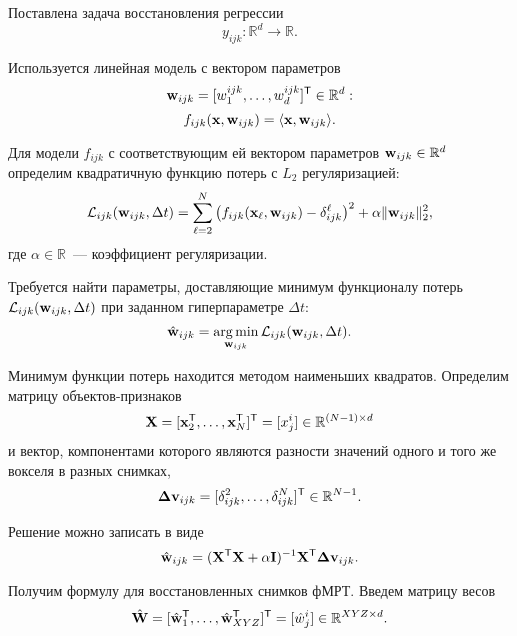 \documentclass[a4paper, 12pt]{article}
\begin{document}
	Поставлена задача восстановления регрессии
	\begin{equation}
		\label{eq6}
		y_{ijk}: \mathbb{R}^{d} \to \mathbb{R}.
	\end{equation}
		
	Используется линейная модель с вектором параметров 
	\[ \mathbf{w}_{ijk} = [w^{ijk}_1, \ldots, w^{ijk}_{d}]^{\mathsf{T}} \in \mathbb{R}^{d}: \]
	\begin{equation}
		\label{eq7}
		f_{ijk}(\mathbf{x}, \mathbf{w}_{ijk}) = \langle \mathbf{x}, \mathbf{w}_{ijk} \rangle.
	\end{equation}

	Для модели $f_{ijk}$ с соответствующим ей вектором параметров $\mathbf{w}_{ijk} \in \mathbb{R}^{d}$
	определим квадратичную функцию потерь с $L_2$ регуляризацией:
	\begin{equation}
		\label{eq8}
		\mathcal{L}_{ijk}(\mathbf{w}_{ijk}, \Delta t) = \sum\limits_{\ell = 2}^{N} \big(f_{ijk}(\mathbf{x}_{\ell}, \mathbf{w}_{ijk}) - \delta^{\ell}_{ijk}\big)^2 + \alpha \| \mathbf{w}_{ijk} \|_2^2,
	\end{equation}
	где $\alpha \in \mathbb{R}$~--- коэффициент регуляризации.

	Требуется найти параметры, доставляющие минимум функционалу потерь $\mathcal{L}_{ijk}(\mathbf{w}_{ijk}, \Delta t)$
	при заданном гиперпараметре $\Delta t$:
	\begin{equation}
		\label{eq9}
		\hat{\mathbf{w}}_{ijk} = \operatorname*{arg\,min}_{\mathbf{w}_{ijk}} \mathcal{L}_{ijk}(\mathbf{w}_{ijk}, \Delta t).
	\end{equation}

	Минимум функции потерь находится методом наименьших квадратов. Определим матрицу объектов-признаков
	\begin{equation}
		\label{eq10}
		\mathbf{X} = [\mathbf{x}_2^{\mathsf{T}}, \ldots, \mathbf{x}_N^{\mathsf{T}}]^{\mathsf{T}} = [x^i_j] \in \mathbb{R}^{(N-1) \times d}
	\end{equation}
	и вектор, компонентами которого являются разности значений одного и того же вокселя в разных снимках,
	\begin{equation}
		\label{eq11}
		\mathbf{\Delta v}_{ijk} = [\delta^2_{ijk}, \ldots, \delta^N_{ijk}]^{\mathsf{T}} \in \mathbb{R}^{N-1}.
	\end{equation}

	Решение можно записать в виде
	\begin{equation}
		\label{eq12}
		\hat{\mathbf{w}}_{ijk} = (\mathbf{X}^{\mathsf{T}} \mathbf{X} + \alpha \mathbf{I})^{-1} \mathbf{X}^{\mathsf{T}} \mathbf{\Delta v}_{ijk}.
	\end{equation}

	Получим формулу для восстановленных снимков фМРТ. Введем матрицу весов
	\begin{equation}
		\label{eq13}
		\hat{\mathbf{W}} = [\hat{\mathbf{w}}_1^{\mathsf{T}}, \ldots, \hat{\mathbf{w}}_{XYZ}^{\mathsf{T}}]^{\mathsf{T}} = [\hat{w}^i_j] \in \mathbb{R}^{XYZ \times d}.
	\end{equation}
\end{document}
